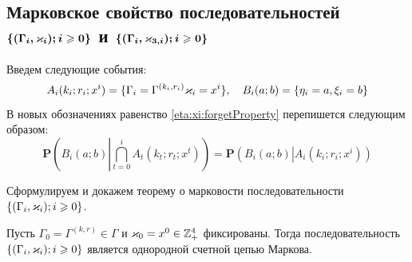 \documentclass[a4paper,12pt,russian]{extarticle}
\newcommand{\G}{\Gamma}
\newcommand{\Mark}{\{(\G_i, \vk_i); i \geqslant 0\}}
\newcommand{\MarkThree}{\{(\G_i, \vk_{3,i}); i \geqslant 0\}}
\newcommand{\ga}[1]{\Gamma^{\left( #1 \right)} }
\renewcommand{\Pr}{{\mathbf P}}
\begin{document}
\subsection[Марковское свойство последовательностей $\boldsymbol{\Mark}$ и $\boldsymbol{\MarkThree}$]%
{Марковское свойство последовательностей \\ $\boldsymbol{\Mark}$ и $\boldsymbol{\MarkThree}$}

Введем следующие события:
\begin{equation*}
A_i(k_i;r_i;x^i) = \{\G_i=\ga{k_i,r_i}\vk_i=x^i\}, \quad  B_i(a;b) = \{\eta_i=a, \xi_i=b\}
\end{equation*}
В новых обозначениях равенство \eqref{eta:xi:forgetProperty}  перепишется следующим образом:
\begin{equation}
\Pr \left(B_i(a;b) \left| \bigcap_{t=0}^{i} A_t(k_t;r_t;x^t)\right.\right) = \Pr \left(B_i(a;b) \left|  A_i(k_i;r_i;x^i)\right.\right)
\label{new:notation:eta:xi:forget}
\end{equation}

Сформулируем и докажем теорему о марковости последовательности \linebreak$\Mark$.
\begin{theorem}
Пусть $\G_0=\ga{k,r}\in \G$ и $\varkappa_0=x^0\in \mathbb{Z}_+^4$ фиксированы. Тогда последовательность $\Mark$ является однородной счетной цепью Маркова. 
\end{theorem}
\end{document}
